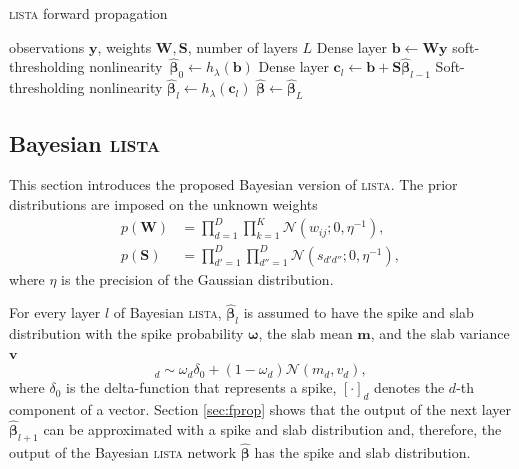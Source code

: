 \documentclass{article}
\begin{document}
  \begin{algorithm}[t]
    \caption{\textsc{lista} forward propagation}
    \label{alg:lista}
    \begin{algorithmic}[1]
      \REQUIRE observations $\mathbf{y}$, weights $\mathbf{W}, \mathbf{S}$, number of layers $L$
      \STATE Dense layer $\mathbf{b} \gets \mathbf{W}\mathbf{y}$ \label{eq:first_layer}
      \STATE soft-thresholding nonlinearity~$\widehat{\boldsymbol\beta}_0 \gets h_\lambda(\mathbf{b})$ \label{eq:thr_first}
        \STATE Dense layer $\mathbf{c}_l \gets \mathbf{b} + \mathbf{S}\widehat{\boldsymbol\beta}_{l-1}$ \label{eq:l_dense_layer}
        \STATE Soft-thresholding nonlinearity $\widehat{\boldsymbol\beta}_{l} \gets h_\lambda(\mathbf{c}_l)$ \label{eq:l_thr}
      \ENDFOR
      \RETURN $\widehat{\boldsymbol\beta} \gets \widehat{\boldsymbol\beta}_{L}$
    \end{algorithmic}
  \end{algorithm}


  \subsection{Bayesian \textsc{lista}}
  \label{subsec:bayesian_lista}
  This section introduces the proposed Bayesian version of \textsc{lista}. The prior distributions are imposed on the unknown weights
  \begin{equation}
  \label{eq:ws}
  \begin{split}
  p(\mathbf{W}) &= \prod_{d=1}^D\prod_{k=1}^K \mathcal{N}(w_{ij} ; 0, \eta^{-1}), \\
  p(\mathbf{S}) &= \prod_{d'=1}^D\prod_{d''=1}^D \mathcal{N}(s_{d'd''} ; 0, \eta^{-1}),
  \end{split}
  \end{equation}
  where $\eta$ is the precision of the Gaussian distribution.
  
  For every layer $l$ of Bayesian \textsc{lista}, $\widehat{\boldsymbol\beta}_{l}$ is assumed to have the spike and slab distribution with the spike probability $\boldsymbol\omega$, the slab mean $\mathbf{m}$, and the slab variance $\mathbf{v}$
  \begin{equation}
  [\widehat{\boldsymbol\beta}_{l}]_d \sim \omega_d \delta_0 + (1 - \omega_d)\mathcal{N}(m_d, v_d),
  \end{equation}
  where $\delta_0$ is the delta-function that represents a spike, $[\cdot]_d$ denotes the $d$-th component of a vector. Section \ref{sec:fprop} shows that the output of the next layer $\widehat{\boldsymbol\beta}_{l+1}$ can be approximated with a spike and slab distribution and, therefore, the output of the Bayesian \textsc{lista} network $\widehat{\boldsymbol\beta}$ has the spike and slab distribution.
  
\end{document}
